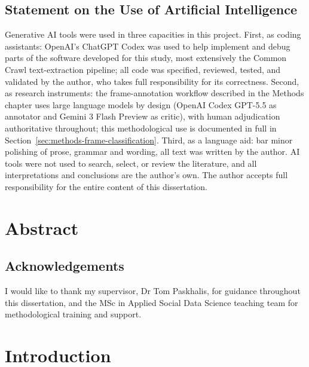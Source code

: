 \documentclass[a4paper,oneside,12pt]{book}
\begin{document}
\newpage

\section*{Statement on the Use of Artificial Intelligence}
Generative AI tools were used in three capacities in this project. First, as coding assistants: OpenAI's ChatGPT Codex was used to help implement and debug parts of the software developed for this study, most extensively the Common Crawl text-extraction pipeline; all code was specified, reviewed, tested, and validated by the author, who takes full responsibility for its correctness. Second, as research instruments: the frame-annotation workflow described in the Methods chapter uses large language models by design (OpenAI Codex GPT-5.5 as annotator and Gemini 3 Flash Preview as critic), with human adjudication authoritative throughout; this methodological use is documented in full in Section~\ref{sec:methods-frame-classification}. Third, as a language aid: bar minor polishing of prose, grammar and wording, all text was written by the author. AI tools were not used to search, select, or review the literature, and all interpretations and conclusions are the author's own. The author accepts full responsibility for the entire content of this dissertation.

\newpage

\chapter*{Abstract}


\newpage
\section*{Acknowledgements}
I would like to thank my supervisor, Dr Tom Paskhalis, for guidance throughout this dissertation, and the MSc in Applied Social Data Science teaching team for methodological training and support.

\newpage
\tableofcontents
\newpage
\listoffigures
\newpage
\listoftables
\newpage

\mainmatter
\onehalfspacing

\chapter{Introduction}

\end{document}
